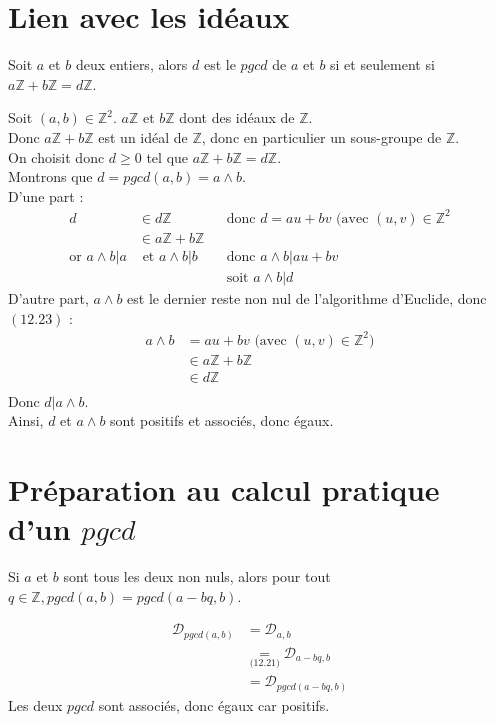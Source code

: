 \documentclass[../main.tex]{subfiles}
\begin{document}
\setcounter{section}{36}
\section{Lien avec les idéaux}
\begin{tcolorbox}[title=Propostion 12.37, title filled=false, colframe=lightblue, colback=lightblue!10!white]
    Soit $a$ et $b$ deux entiers, alors $d$ est le $pgcd$ de $a$ et $b$ si et seulement si $a \mathbb{Z} + b \mathbb{Z} = d \mathbb{Z}$.
\end{tcolorbox}

Soit $(a,b) \in \mathbb{Z}^2$. $a \mathbb{Z} \text{ et } b \mathbb{Z}$ dont des idéaux de $\mathbb{Z}$. \\
Donc $a \mathbb{Z} + b \mathbb{Z}$ est un idéal de $\mathbb{Z}$, donc en particulier un sous-groupe de $\mathbb{Z}$. \\
On choisit donc $d \geq 0$ tel que $a \mathbb{Z} + b \mathbb{Z} = d \mathbb{Z}$. \\
Montrons que $d = pgcd(a,b) = a \wedge b$. \\
D'une part : 
\begin{align*}
    d &\in d \mathbb{Z} && \text{donc } d = au + bv \text{ (avec $(u, v) \in \mathbb{Z}^2$} \\
    &\in a \mathbb{Z} + b \mathbb{Z} \\
    \text{or } a \wedge b | a &\text{ et } a \wedge b | b && \text{donc } a \wedge b | au + bv \\
    & && \text{soit } a \wedge b | d
\end{align*}
D'autre part, $a \wedge b$ est le dernier reste non nul de l'algorithme d'Euclide, donc $(\text{12.23})$ :
\begin{align*}
    a \wedge b &= au + bv \text{ (avec $(u, v) \in \mathbb{Z}^2$)} \\
    &\in a \mathbb{Z} + b \mathbb{Z} \\
    &\in d \mathbb{Z} \\
\end{align*}
Donc $d | a \wedge b$. \\
Ainsi, $d$ et $a \wedge b$ sont positifs et associés, donc égaux.

\section{Préparation au calcul pratique d'un $pgcd$}
\begin{tcolorbox}[title=Lemme 12.38, title filled=false, colframe=orange, colback=orange!10!white]
    Si $a$ et $b$ sont tous les deux non nuls, alors pour tout $q \in \mathbb{Z}, pgcd(a,b) = pgcd(a - bq, b)$.
\end{tcolorbox}
\begin{align*}
    \mathcal{D}_{pgcd(a,b)} &= \mathcal{D}_{a,b} \\
    &\underset{\text{(12.21)}}{=} \mathcal{D}_{a - bq, b} \\
    &= \mathcal{D}_{pgcd(a - bq, b)}
\end{align*}
Les deux $pgcd$ sont associés, donc égaux car positifs. 
\end{document}
